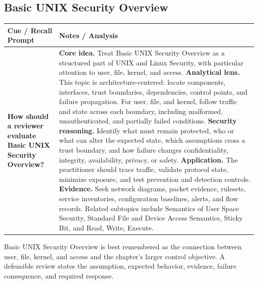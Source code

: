 \documentclass[11pt]{article}
\newcommand{\CornellHeader}{%
\rowcolor{Navy}\color{white}\bfseries Cue / Recall Prompt & \color{white}\bfseries Notes / Analysis\\\hline}
\newcommand{\CornellRow}[2]{%
\cellcolor{CueGray}\RaggedRight\textbf{#1} & \RaggedRight #2\\\hline}
\begin{document}
\subsection*{Basic UNIX Security Overview}
\begin{longtable}{>{\RaggedRight\arraybackslash}p{}|>{\RaggedRight\arraybackslash}p{}}
\CornellHeader
\CornellRow{How should a reviewer evaluate Basic UNIX Security Overview?}{\textbf{Core idea.} Treat Basic UNIX Security Overview as a structured part of UNIX and Linux Security, with particular attention to user, file, kernel, and access. \textbf{Analytical lens.} This topic is architecture-centered: locate components, interfaces, trust boundaries, dependencies, control points, and failure propagation. For user, file, and kernel, follow traffic and state across each boundary, including malformed, unauthenticated, and partially failed conditions. \textbf{Security reasoning.} Identify what must remain protected, who or what can alter the expected state, which assumptions cross a trust boundary, and how failure changes confidentiality, integrity, availability, privacy, or safety. \textbf{Application.} The practitioner should trace traffic, validate protocol state, minimize exposure, and test prevention and detection controls. \textbf{Evidence.} Seek network diagrams, packet evidence, rulesets, service inventories, configuration baselines, alerts, and flow records. Related subtopics include Semantics of User Space Security, Standard File and Device Access Semantics, Sticky Bit, and Read, Write, Execute.}
\end{longtable}
\begin{topicsummary}
Basic UNIX Security Overview is best remembered as the connection between user, file, kernel, and access and the chapter's larger control objective. A defensible review states the assumption, expected behavior, evidence, failure consequence, and required response.
\end{topicsummary}
\end{document}
